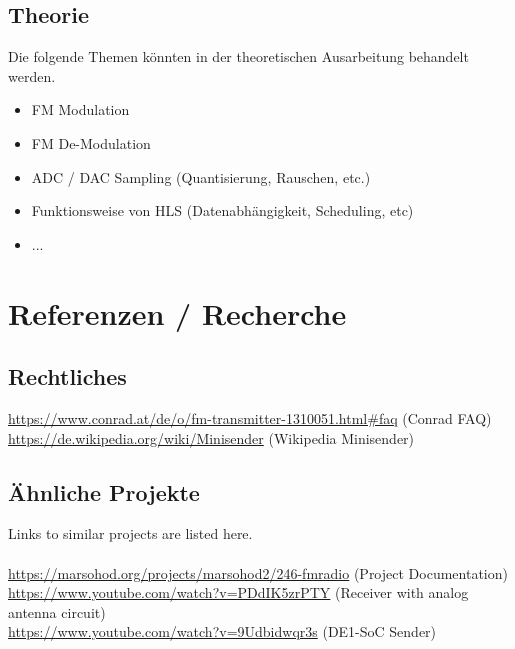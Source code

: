 \subsection{Theorie}

Die folgende Themen könnten in der theoretischen Ausarbeitung behandelt werden.

\begin{itemize}
  \item FM Modulation
  \item FM De-Modulation
  \item ADC / DAC Sampling (Quantisierung, Rauschen, etc.)
  \item Funktionsweise von HLS (Datenabhängigkeit, Scheduling, etc)
  \item ...
\end{itemize}



\section{Referenzen / Recherche}

\subsection{Rechtliches}

\url{https://www.conrad.at/de/o/fm-transmitter-1310051.html#faq} (Conrad FAQ)\\
\url{https://de.wikipedia.org/wiki/Minisender} (Wikipedia Minisender)

\subsection{Ähnliche Projekte}
Links to similar projects are listed here.\\
\\
\url{https://marsohod.org/projects/marsohod2/246-fmradio} (Project Documentation)
\\
\url{https://www.youtube.com/watch?v=PDdIK5zrPTY} (Receiver with analog antenna circuit)
\\
\url{https://www.youtube.com/watch?v=9Udbidwqr3s} (DE1-SoC Sender)

